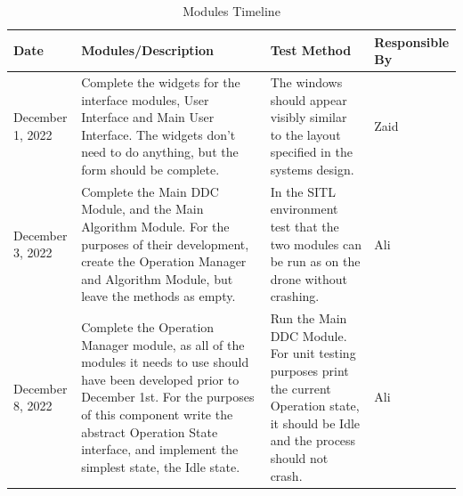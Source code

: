 \documentclass[12pt, titlepage]{article}
\begin{document}
\begin{table}[!h]
\begin{center}
\caption {Modules Timeline}
\label{tab:moduleTimeline}
\begin{tabular}{ | m{2.5cm} | m{5cm} | m{5.5cm} | m{2cm} | } 
\hline
Date & Modules/Description & Test Method & Responsible By \\
\hline
December 1, 2022 & Complete the widgets for the interface modules, User Interface and Main User Interface. The widgets don't need to do anything, but the form should be complete.   & 
    The windows should appear visibly similar to the layout specified in the systems design. & Zaid \\
\hline
December 3, 2022 & Complete the Main DDC Module, and the Main Algorithm Module. For the purposes of their development, create the Operation Manager and Algorithm Module, but leave the methods as empty. & 
    In the SITL environment test that the two modules can be run as on the drone without crashing. & Ali \\
\hline
December 8, 2022 & Complete the Operation Manager module, as all of the modules it needs to use should have been developed prior to December 1st. For the purposes of this component write the abstract Operation State interface, and implement the simplest state, the Idle state. & 
    Run the Main DDC Module. For unit testing purposes print the current Operation state, it should be Idle and the process should not crash. & Ali \\
\hline
\end{tabular}
\end{center}
\end{table}
\end{document}
